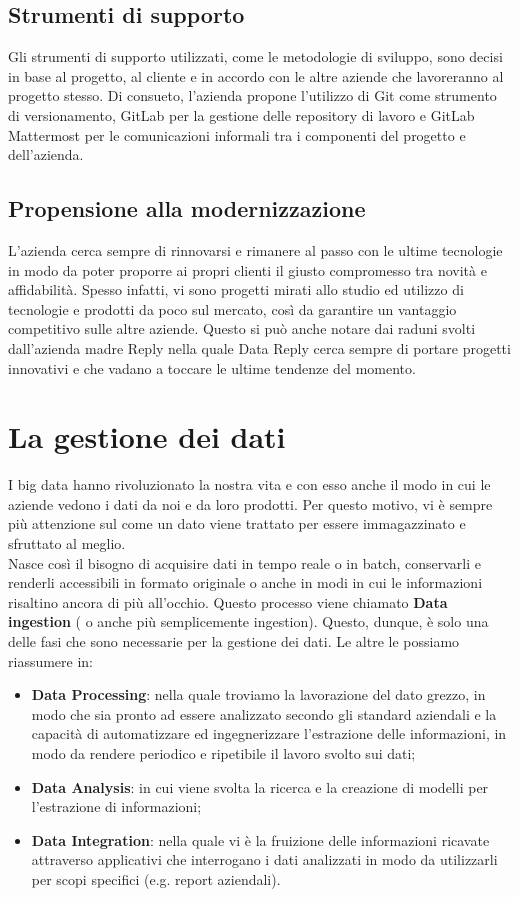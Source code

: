 \subsection{Strumenti di supporto}
Gli strumenti di supporto utilizzati, come le metodologie di sviluppo,  sono decisi in base al progetto, al cliente e in accordo con le altre aziende che lavoreranno al progetto stesso.
Di consueto, l'azienda propone l'utilizzo di \gls{Git} come strumento di versionamento, \gls{GitLab} per la gestione delle repository di lavoro e \gls{GitLab Mattermost} per le comunicazioni informali tra i componenti del progetto e dell'azienda.
\subsection{Propensione alla modernizzazione}
L'azienda cerca sempre di rinnovarsi e rimanere al passo con le ultime tecnologie in modo da poter proporre ai propri clienti il giusto compromesso tra novità e affidabilità. Spesso infatti, vi sono progetti mirati allo studio ed utilizzo di tecnologie e prodotti da poco sul mercato, così da garantire un vantaggio competitivo sulle altre aziende.
Questo si può anche notare dai raduni svolti dall'azienda madre Reply nella quale Data Reply cerca sempre di portare progetti innovativi e che vadano a toccare le ultime tendenze del momento.
\section{La gestione dei dati}
I big data hanno rivoluzionato la nostra vita e con esso anche il modo in cui le aziende vedono i dati da noi e da loro prodotti. Per questo motivo, vi è sempre più attenzione sul come un dato viene trattato per essere immagazzinato e sfruttato al meglio.
\\
Nasce così il bisogno di acquisire dati in tempo reale o in \gls{batch}, conservarli e renderli accessibili in formato originale o anche in modi in cui le informazioni risaltino ancora di più all'occhio.
Questo processo viene chiamato \textbf{Data ingestion} ( o anche più semplicemente ingestion).
Questo, dunque, è solo una delle fasi che sono necessarie per la gestione dei dati.
Le altre le possiamo riassumere in:
\begin{itemize}
	\item \textbf{Data Processing}: nella quale troviamo la lavorazione del dato grezzo, in modo che sia pronto ad essere analizzato secondo gli standard aziendali e la capacità di automatizzare ed ingegnerizzare l'estrazione delle informazioni, in modo da rendere periodico e ripetibile il lavoro svolto sui dati;
	\item \textbf{Data Analysis}: in cui viene svolta la ricerca e la creazione di modelli per l'estrazione di informazioni;
	\item \textbf{Data Integration}: nella quale vi è la fruizione delle informazioni ricavate attraverso applicativi che interrogano i dati analizzati in modo da utilizzarli per scopi specifici (e.g. report aziendali).
\end{itemize}


